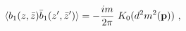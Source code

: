 \begin{equation}\label{2.16}
\langle b_1(z,\bar{z}) \bar{b}_1(z',\bar{z}') \rangle=
-{im \over 2\pi}~ K_0(d^2 m^2({\bf p}))~,
\end{equation}

